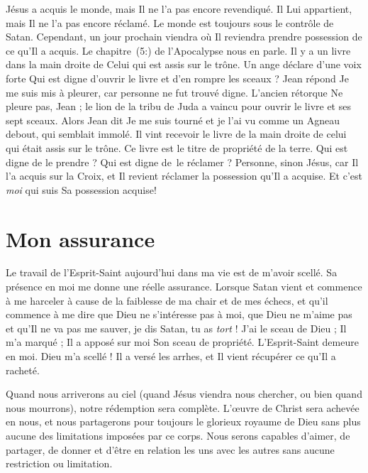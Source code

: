 Jésus a acquis le monde, mais Il ne l'a pas encore revendiqué.
 Il Lui appartient, mais Il ne l'a pas encore réclamé.
 Le monde est toujours sous le contrôle de Satan.
 Cependant, un jour prochain viendra où Il reviendra prendre possession
 de ce qu'Il a acquis.
 Le chapitre~(5:) de l'Apocalypse nous en parle.
 Il y a un livre dans la main droite de Celui qui est assis sur le trône.
 Un ange déclare d'une voix forte\frcolon{}
 \Og Qui est digne d'ouvrir le livre et d'en rompre les sceaux ? \Fg{}
 Jean répond\frcolon{} \Og Je me suis mis à pleurer,
 car personne ne fut trouvé digne. \Fg{}
 L'ancien rétorque\frcolon{} \Og Ne pleure pas, Jean ;
 le lion de la tribu de Juda a vaincu pour ouvrir
 le livre et ses sept sceaux. \Fg{}
 Alors Jean dit\frcolon{} \Og Je me suis tourné et je l'ai vu comme un Agneau debout,
 qui semblait immolé. Il vint recevoir le livre de la main droite
 de celui qui était assis sur le trône. \Fg{}
 Ce livre est le titre de propriété de la terre.
 Qui est digne de le prendre ? Qui est digne de~le réclamer ?
 Personne, sinon Jésus, car Il l'a acquis sur la Croix, et Il revient
 réclamer la possession qu'Il a acquise.
 Et c'est \emph{moi} qui suis Sa possession acquise!


\section{Mon assurance}

Le travail de l'Esprit-Saint aujourd'hui dans ma vie est de m'avoir scellé.
 Sa présence en moi me donne une réelle assurance.
 Lorsque Satan  vient et commence à me harceler à cause
 de la faiblesse de ma chair et de mes échecs,
 et qu'il commence à me dire que Dieu
 ne s'intéresse pas à moi, que Dieu ne m'aime pas et qu'Il ne va pas
 me sauver, je dis\frcolon{}
 \Og Satan, tu as \emph{tort} ! J'ai le sceau de Dieu ; Il m'a marqué ;
 Il a apposé sur moi Son sceau de propriété. L'Esprit-Saint demeure en moi.
 Dieu m'a scellé ! Il a versé les arrhes, et Il vient récupérer
 ce qu'Il a racheté. \Fg{}

Quand nous arriverons au ciel (quand Jésus viendra nous chercher,
 ou bien quand nous mourrons), notre rédemption sera complète.
 L'œu\-vre de Christ sera achevée en nous, et nous partagerons pour
 toujours le glorieux royaume de Dieu sans plus aucune des limitations
 imposées par ce corps. Nous serons capables d'aimer, de partager, de donner
 et d'être en relation les uns avec les autres sans aucune restriction
 ou limitation.

